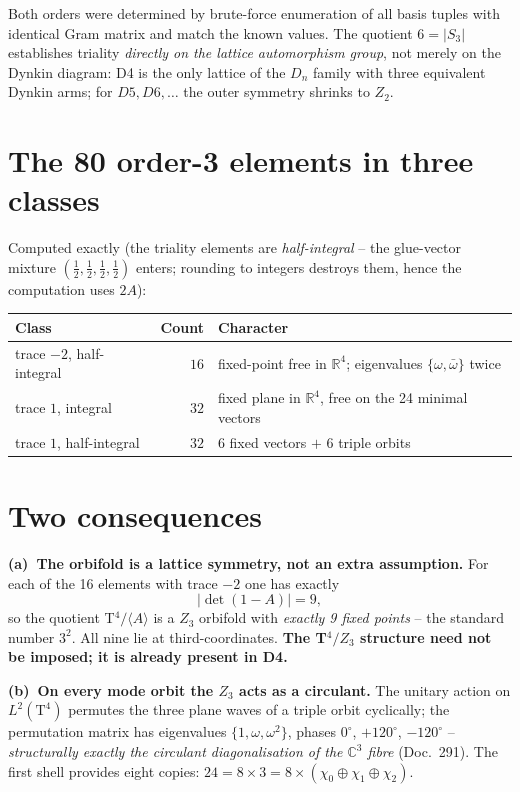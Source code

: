 \documentclass[11pt]{report}
\begin{document}
Both orders were determined by brute-force enumeration of all basis
tuples with identical Gram matrix and match the known values. The
quotient $6 = |S_3|$ establishes triality \emph{directly on the
lattice automorphism group}, not merely on the Dynkin diagram: D4 is
the only lattice of the $D_n$ family with three equivalent Dynkin
arms; for $D5, D6, \dots$ the outer symmetry shrinks to $Z_2$.

\section{The 80 order-3 elements in three classes}

Computed exactly (the triality elements are \emph{half-integral} --
the glue-vector mixture $(\frac12,\frac12,\frac12,\frac12)$ enters;
rounding to integers destroys them, hence the computation uses
$2A$):

\begin{center}
\begin{tabular}{lrl}
\toprule
Class & Count & Character \\
\midrule
trace $-2$, half-integral & $16$ & fixed-point free in
  $\mathbb{R}^4$; eigenvalues $\{\omega,\bar\omega\}$ twice \\
trace $1$, integral & $32$ & fixed plane in $\mathbb{R}^4$,
  free on the 24 minimal vectors \\
trace $1$, half-integral & $32$ & 6 fixed vectors $+$ 6 triple
  orbits \\
\bottomrule
\end{tabular}
\end{center}

\section{Two consequences}

\textbf{(a)~The orbifold is a lattice symmetry, not an extra
assumption.} For each of the 16 elements with trace $-2$ one has
exactly
\begin{equation}
  |\det(1-A)| = 9,
\end{equation}
so the quotient T$^4/\langle A\rangle$ is a $Z_3$ orbifold with
\emph{exactly 9 fixed points} -- the standard number $3^2$. All nine
lie at third-coordinates. \textbf{The T$^4/Z_3$ structure need not
be imposed; it is already present in D4.}

\textbf{(b)~On every mode orbit the $Z_3$ acts as a circulant.} The
unitary action on $L^2(\text{T}^4)$ permutes the three plane waves
of a triple orbit cyclically; the permutation matrix has eigenvalues
$\{1,\omega,\omega^2\}$, phases $0^\circ$, $+120^\circ$,
$-120^\circ$ -- \emph{structurally exactly the circulant
diagonalisation of the $\mathbb{C}^3$ fibre} (Doc.~291). The first
shell provides eight copies: $24 = 8\times3
= 8\times(\chi_0\oplus\chi_1\oplus\chi_2)$.
\end{document}

